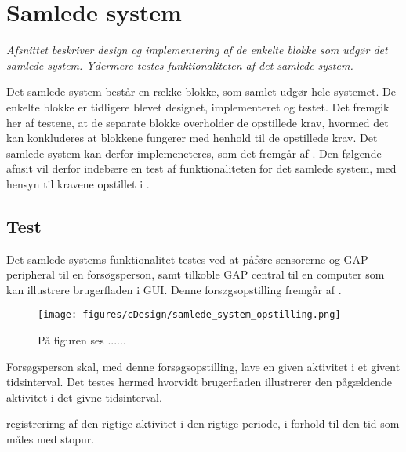 \section{Samlede system}
\textit{Afsnittet beskriver design og implementering af de enkelte blokke som udgør det samlede system. Ydermere testes funktionaliteten af det samlede system.}

Det samlede system består en række blokke, som samlet udgør hele systemet. De enkelte blokke er tidligere blevet designet, implementeret og testet. Det fremgik her af testene, at de separate blokke overholder de opstillede krav, hvormed det kan konkluderes at blokkene fungerer med henhold til de opstillede krav. Det samlede system kan derfor implemeneteres, som det fremgår af . Den følgende afnsit vil derfor indebære en test af funktionaliteten for det samlede system, med hensyn til kravene opstillet i . 

\subsection{Test}
Det samlede systems funktionalitet testes ved at påføre sensorerne og GAP peripheral til en forsøgsperson, samt tilkoble GAP central til en computer som kan illustrere brugerfladen i GUI. Denne forsøgsopstilling fremgår af .

\begin{figure}[H]
	\centering
	\texttt{[image: figures/cDesign/samlede\_system\_opstilling.png]}
	\caption{På figuren ses ......}
	\label{fig:samlede_system_opstilling}
\end{figure}

Forsøgsperson skal, med denne forsøgsopstilling, lave en given aktivitet i et givent tidsinterval. Det testes hermed hvorvidt brugerfladen illustrerer den pågældende aktivitet i det givne tidsinterval. 







registrerirng af den rigtige aktivitet i den rigtige periode, i forhold til den tid som måles med stopur. 